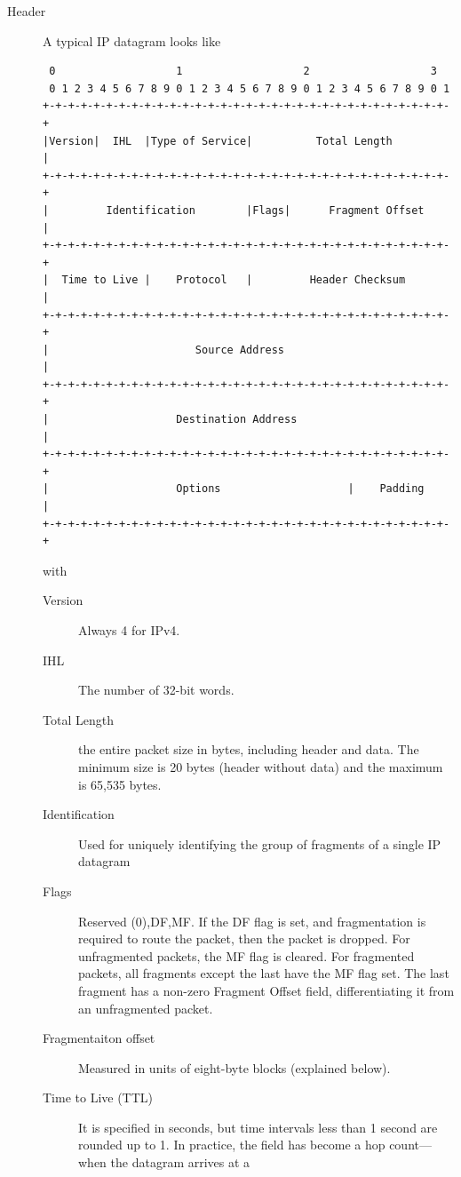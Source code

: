\documentclass{article}
\begin{document}
\begin{description}
    \item[Header] A typical IP datagram looks like
    \begin{lstlisting}
 0                   1                   2                   3   
 0 1 2 3 4 5 6 7 8 9 0 1 2 3 4 5 6 7 8 9 0 1 2 3 4 5 6 7 8 9 0 1 
+-+-+-+-+-+-+-+-+-+-+-+-+-+-+-+-+-+-+-+-+-+-+-+-+-+-+-+-+-+-+-+-+
|Version|  IHL  |Type of Service|          Total Length         |
+-+-+-+-+-+-+-+-+-+-+-+-+-+-+-+-+-+-+-+-+-+-+-+-+-+-+-+-+-+-+-+-+
|         Identification        |Flags|      Fragment Offset    |
+-+-+-+-+-+-+-+-+-+-+-+-+-+-+-+-+-+-+-+-+-+-+-+-+-+-+-+-+-+-+-+-+
|  Time to Live |    Protocol   |         Header Checksum       |
+-+-+-+-+-+-+-+-+-+-+-+-+-+-+-+-+-+-+-+-+-+-+-+-+-+-+-+-+-+-+-+-+
|                       Source Address                          |
+-+-+-+-+-+-+-+-+-+-+-+-+-+-+-+-+-+-+-+-+-+-+-+-+-+-+-+-+-+-+-+-+
|                    Destination Address                        |
+-+-+-+-+-+-+-+-+-+-+-+-+-+-+-+-+-+-+-+-+-+-+-+-+-+-+-+-+-+-+-+-+
|                    Options                    |    Padding    |
+-+-+-+-+-+-+-+-+-+-+-+-+-+-+-+-+-+-+-+-+-+-+-+-+-+-+-+-+-+-+-+-+
    \end{lstlisting}
    with
    \begin{description}
        \item[Version] Always 4 for IPv4.
        \item[IHL] The number of 32-bit words. 
        \item[Total Length] the entire packet size in bytes, including header and data. The minimum size
        is 20 bytes (header without data) and the maximum is 65,535 bytes.
        \item[Identification] Used for uniquely identifying the group of fragments of a single IP datagram
        \item[Flags] Reserved (0),DF,MF. If the DF flag is set, and fragmentation is required to route
        the packet, then the packet is dropped. For unfragmented packets, the MF flag is cleared. For
        fragmented packets, all fragments except the last have the MF flag set. The last fragment has a
        non-zero Fragment Offset field, differentiating it from an unfragmented packet.
        \item[Fragmentaiton offset] Measured in units of eight-byte blocks (explained below).
        \item[Time to Live (TTL)] It is specified in seconds, but time intervals less than 1 second are
        rounded up to 1. In practice, the field has become a hop count—when the datagram arrives at a

\end{description}
\end{description}
\end{document}
